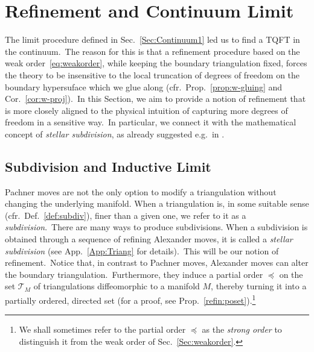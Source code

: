\documentclass[11pt]{article}
\theoremstyle{definition}
\numberwithin{equation}{section}
\begin{document}
\section{Refinement and Continuum Limit}\label{Sec:Continuum2}

The limit procedure defined in Sec.~\ref{Sec:Continuum1} led us to find a TQFT in the continuum.~The reason for this is that a refinement procedure based on the weak order~\eqref{eq:weakorder}, while keeping the boundary triangulation fixed, forces the theory to be insensitive to the local truncation of degrees of freedom on the boundary hypersuface which we glue along (cfr.~Prop.~\ref{prop:w-gluing} and Cor.~\ref{cor:w-proj}).~In this Section, we aim to provide a  notion of refinement that is more closely aligned to the physical intuition of capturing more degrees of freedom in a sensitive way.~In particular, we connect it with the mathematical concept of \textit{stellar subdivision}, as already suggested e.g.~in \cite{Dittrich_Geiller_2015}.

\subsection{Subdivision and Inductive Limit}\label{Sec:SubdivIndLim}

Pachner moves are not the only option to modify a triangulation without changing the underlying manifold. When a triangulation is, in some suitable sense (cfr.~Def.~\ref{def:subdiv}), finer than a given one, we refer to it as a \textit{subdivision}.~There are many ways to produce subdivisions. When a subdivision is obtained through a sequence of refining Alexander moves, it is called a \textit{stellar subdivision} (see App.~\ref{App:Triang} for details).~This will be our notion of refinement.~Notice that, in contrast to Pachner moves, Alexander moves can alter the boundary triangulation.~Furthermore, they induce a partial order $\preceq$ on the set $\mathcal{T}_M$ of triangulations diffeomorphic to a manifold $M$, thereby turning it into a partially ordered, directed set (for a proof, see Prop.~\ref{refin:poset}).\footnote{We shall sometimes refer to the partial order $\preceq$ as the \emph{strong order} to distinguish it from the weak order of Sec.~\ref{Sec:weakorder}.}
\end{document}
